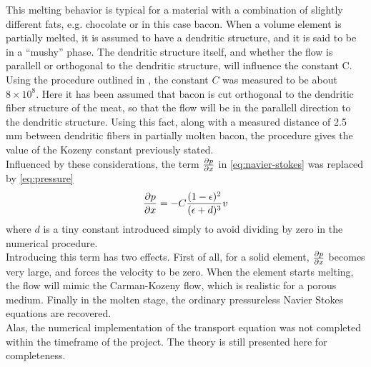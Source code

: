 This melting behavior is typical for a material with a combination of slightly different
fats, e.g. chocolate or in this case bacon. When a volume element is partially
melted, it is assumed to have a dendritic structure, and it is said to be in a
``mushy'' phase. The dendritic structure itself, and whether the flow is parallell or
orthogonal to the dendritic structure, will influence the constant C. \\

Using the procedure outlined in \cite{poirier}, the constant $C$ was measured to
be about $8 \times 10^8$. Here it has been assumed that bacon is cut orthogonal
to the dendritic fiber structure of the meat, so that the flow will be in the
parallell direction to the dendritic structure. Using this fact, along with a
measured distance of 2.5 mm between dendritic fibers in partially molten bacon, 
the procedure gives the value of the Kozeny constant previously stated.\\

Influenced by these considerations, the term $\frac{\partial p}{\partial x}$ in
\cref{eq:navier-stokes} was replaced by \cref{eq:pressure}
\begin{equation}
  \frac{\partial p}{\partial x} =  -C\frac{ (1-\epsilon)^2}{(\epsilon+d)^3} v
  \label{eq:pressure}
\end{equation}
where $d$ is a tiny constant introduced simply to avoid dividing by zero in the
numerical procedure.\\

Introducing this term has two effects. First of all, for a solid element,
$\frac{\partial p}{\partial x}$ becomes very large, and forces the velocity to be zero. When the
element starts melting, the flow will mimic the Carman-Kozeny flow, which is
realistic for a porous medium. Finally in the molten stage, the ordinary
pressureless Navier Stokes equations are recovered.\\

Alas, the numerical implementation of the transport equation was not completed
within the timeframe of the project. The theory is still presented here for
completeness.\\ %

